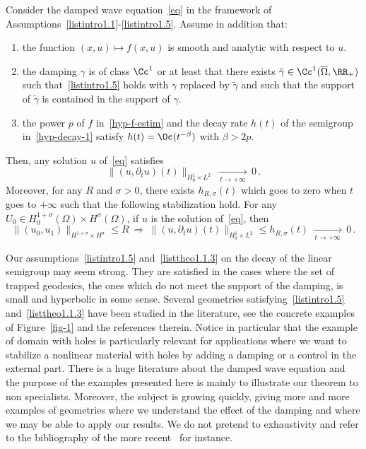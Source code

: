 \begin{theo}\label{th1}
Consider the damped wave equation~\eqref{eq} in the framework of Assumptions~\eqref{listintro1.1}-\eqref{listintro1.5}. Assume in addition that:
\begin{enumerate}\alphenumi
\item \label{listtheo1.1.1}the function $(x,u)\mapsto f(x,u)$ is smooth and analytic with respect to $u$.
\item \label{listtheo1.1.2}the damping $\gamma$ is of class $\Cc^1$ or at least that there exists $\tilde\gamma\in\Cc^1(\overline\Omega,\RR_+)$ such that~\eqref{listintro1.5} holds with $\gamma$ replaced by $\tilde\gamma$ and such that the support of $\tilde\gamma$ is contained in the support of $\gamma$.
\item \label{listtheo1.1.3}the power $p$ of $f$ in~\eqref{hyp-f-estim} and the decay rate $h(t)$ of the semigroup in~\eqref{hyp-decay-1} satisfy $h(t)=\Oc(t^{-\beta})$ with $\beta>2p$.
\end{enumerate}
Then, any solution $u$ of~\eqref{eq} satisfies
\[
\|(u,\partial_t u)(t)\|_{H^1_0\times L^2}\,\xrightarrow[\:t\longrightarrow
+\infty\:]{}\,0\,.
\]
Moreover, for any $R$ and $\sigma>0$, there exists $h_{R,\sigma}(t)$ which goes to zero when $t$ goes to $+\infty$ such that the following stabilization hold. For any $U_0\in H^{1+\sigma}_0(\Omega)\times H^\sigma(\Omega)$, if $u$ is the solution of~\eqref{eq}, then
\[
\|(u_0,u_1)\|_{H^{1+\sigma}\times H^\sigma}\leq
R\:\Longrightarrow\:\|(u,\partial_t u)(t)\|_{H^1_0\times L^2} \leq
h_{R,\sigma}(t)\,\xrightarrow[\:t\longrightarrow +\infty\:]{}\,0\,.
\]
\end{theo}

Our assumptions~\eqref{listintro1.5} and~\eqref{listtheo1.1.3} on the decay of the linear semigroup may seem strong. They are satisfied in the cases where the set of trapped geodesics, the ones which do not meet the support of the damping, is small and hyperbolic in some sense. Several geometries satisfying~\eqref{listintro1.5} and~\eqref{listtheo1.1.3} have been studied in the literature, see the concrete examples of Figure~\ref{fig-1} and the references therein. Notice in particular that the example of domain with holes is particularly relevant for applications where we want to stabilize a nonlinear material with holes by adding a damping or a control in the external part. There is a huge literature about the damped wave equation and the purpose of the examples presented here is mainly to illustrate our theorem to non specialists. Moreover, the subject is growing quickly, giving more and more examples of geometries where we understand the effect of the damping and where we may be able to apply our results. We do not pretend to exhaustivity and refer to the bibliography of the more recent~\cite{Lin} for instance.


